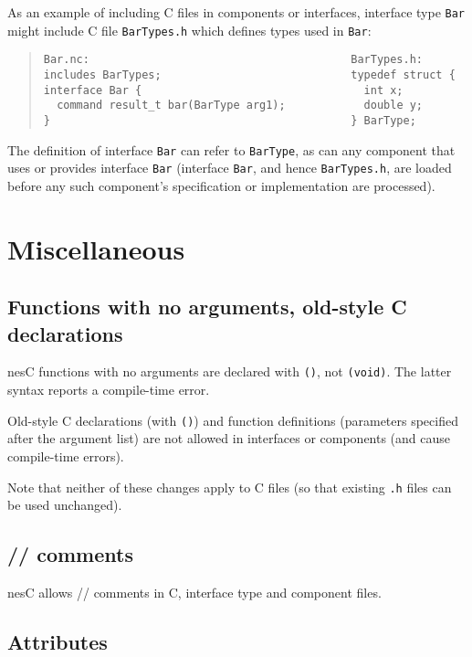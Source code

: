 \documentclass[11pt,letterpaper]{article}
\newcommand{\code}[1]{{\tt #1}}
\newcommand{\file}[1]{{\tt #1}}
\newcommand{\nesc}{nesC\xspace}
\begin{document}
As an example of including C files in components or interfaces, interface
type \code{Bar} might include C file \file{BarTypes.h} which defines types
used in \code{Bar}:

\begin{quote} \begin{verbatim}
Bar.nc:                                        BarTypes.h:      
includes BarTypes;                             typedef struct { 
interface Bar {                                  int x;         
  command result_t bar(BarType arg1);            double y;      
}                                              } BarType;
\end{verbatim} \end{quote}

The definition of interface \code{Bar} can refer to \code{BarType}, as can
any component that uses or provides interface \code{Bar} (interface
\code{Bar}, and hence \file{BarTypes.h}, are loaded before any such
component's specification or implementation are processed).

\section{Miscellaneous}
\label{sec:misc}

\subsection{Functions with no arguments, old-style C declarations}
\label{sec:misc-void}

\nesc functions with no arguments are declared with \code{()}, not
\code{(void)}. The latter syntax reports a compile-time error.

Old-style C declarations (with \code{()}) and function definitions 
(parameters specified after the argument list) are not allowed in
interfaces or components (and cause compile-time errors).

Note that neither of these changes apply to C files (so that existing
\file{.h} files can be used unchanged).

\subsection{// comments}

\nesc allows // comments in C, interface type and component files.

\subsection{Attributes}
\label{sec:attributes}
\end{document}
